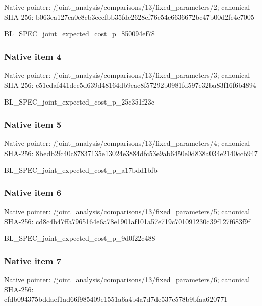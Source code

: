\documentclass[10pt,a4paper]{article}
\begin{document}
Native pointer: /joint\_analysis/comparis\allowbreak{}ons/13/fixed\_parameters/\allowbreak{}2; canonical SHA-256: b063ea127ca0e8cb3eecfbb3\allowbreak{}5fde2628cf76e54c6636672b\allowbreak{}c47b00d2fe4c7005


BL\_SPEC\_joint\_expected\_c\allowbreak{}ost\_p\_850094ef78


\subsubsection{Native item 4}


Native pointer: /joint\_analysis/comparis\allowbreak{}ons/13/fixed\_parameters/\allowbreak{}3; canonical SHA-256: c51edaf441dec5d639d48164\allowbreak{}db9eac8f57292b0981fd597e\allowbreak{}32ba83f16f6b4894


BL\_SPEC\_joint\_expected\_c\allowbreak{}ost\_p\_25c351f23c


\subsubsection{Native item 5}


Native pointer: /joint\_analysis/comparis\allowbreak{}ons/13/fixed\_parameters/\allowbreak{}4; canonical SHA-256: 8bedb2fc40c87837135e1302\allowbreak{}4e3884dfc53e9ab6450e0d83\allowbreak{}8a034e2140ccb947


BL\_SPEC\_joint\_expected\_c\allowbreak{}ost\_p\_a17bdd1bfb


\subsubsection{Native item 6}


Native pointer: /joint\_analysis/comparis\allowbreak{}ons/13/fixed\_parameters/\allowbreak{}5; canonical SHA-256: cd8c4b47ffa7965164e6a78e\allowbreak{}1901af101a57e719c7010912\allowbreak{}30c39f127f683f9f


BL\_SPEC\_joint\_expected\_c\allowbreak{}ost\_p\_9d0f22c488


\subsubsection{Native item 7}


Native pointer: /joint\_analysis/comparis\allowbreak{}ons/13/fixed\_parameters/\allowbreak{}6; canonical SHA-256: cfdb094375bddaef1ad66f98\allowbreak{}5409e1551a6a4b4a7d7de537\allowbreak{}c578b9bfaa620771
\end{document}
